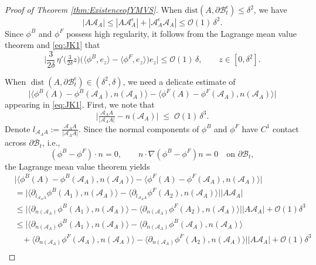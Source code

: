 \documentclass[11pt,twoside,reqno]{amsart}
\numberwithin{equation}{section}
\numberwithin{figure}{section}
\begin{document}
\begin{proof}[Proof of Theorem \ref{thm:ExistenceofYMVS}]
When $\mathrm{dist}(A,\partial\mathcal{B}_t^\epsilon)\leq \delta^2$, we have
\[
|A\mathcal{A}_A| 
  \leq |A\mathcal{A}_A^\epsilon| + |\mathcal{A}_A^\epsilon \mathcal{A}_A|
  \leq \mathcal{O}(1)\,\delta^2.
\]
Since $\phi^B$ and $\phi^F$ possess high regularity, it follows from the Lagrange mean value theorem and \eqref{eq:JK1} that
\begin{equation}\label{eq:JK3}
\bigg|
\frac{3}{2\delta}\,\eta'\!\Big(\tfrac{3}{2\delta}z\Big)
\Big(\langle \phi^B, e_z\rangle - \langle \phi^F, e_z\rangle\Big)e_z
\bigg|
\leq \mathcal{O}(1)\,\delta,
\qquad z \in [0,\delta^2].
\end{equation}

When $\operatorname{dist}(A,\partial\mathcal{B}_t^\epsilon)\in (\delta^2,\delta)$, we need a delicate estimate of
\[
\Big|\langle\phi^B(A)-\phi^B(\mathcal{A}_A),n(\mathcal{A}_A)\rangle
      -\langle\phi^F(A)-\phi^F(\mathcal{A}_A),n(\mathcal{A}_A)\rangle\Big|
\]
appearing in \eqref{eq:JK1}. First, we note that
\begin{equation}\label{eq:normal-approx}
\Big|\tfrac{\mathcal{A}_A A}{|\mathcal{A}_A A|}-n(\mathcal{A}_A)\Big|
\;\le\; \mathcal{O}(1)\,\delta^3 .
\end{equation}
Denote $l_{\mathcal{A}_A A}:=\tfrac{\mathcal{A}_A A}{|\mathcal{A}_A A|}$. Since the normal components of $\phi^B$ and $\phi^F$ have $C^1$ contact across $\partial\mathcal{B}_t$, i.e.,
\[
(\phi^B-\phi^F)\cdot n=0,\qquad
n\cdot\nabla(\phi^B-\phi^F)n=0\quad\text{on } \partial\mathcal{B}_t,
\]
the Lagrange mean value theorem  yields
\begin{equation}\label{eq:JK2}
    \begin{aligned}
       &\Big|\langle\phi^B(A)-\phi^B(\mathcal{A}_A),n(\mathcal{A}_A)\rangle-\langle\phi^F(A)-\phi^F(\mathcal{A}_A),n(\mathcal{A}_A)\rangle\Big|\\
       &=\Big|\langle\partial_{l_{\mathcal{A}_AA}}\phi^B(A_1),n(\mathcal{A}_A)\rangle-\langle\partial_{l_{\mathcal{A}_AA}}\phi^F(A_2),n(\mathcal{A}_A)\rangle\Big|\Big|A\mathcal{A}_A\Big|\\
       &\leq \Big|\langle\partial_{n(\mathcal{A}_A)}\phi^B(A_1),n(\mathcal{A}_A)\rangle-\langle\partial_{n(\mathcal{A}_A)}\phi^F(A_2),n(\mathcal{A}_A)\rangle\Big|\Big|A\mathcal{A}_A\Big|+\mathcal{O}(1)\delta^3\\
       &\leq \Big|\langle\partial_{n(\mathcal{A}_A)}\phi^B(A_1),n(\mathcal{A}_A)\rangle-\langle\partial_{n(\mathcal{A}_A)}\phi^B(\mathcal{A}_A),n(\mathcal{A}_A)\rangle\\&~~~~+\langle\partial_{n(\mathcal{A}_A)}\phi^F(\mathcal{A}_A),n(\mathcal{A}_A)\rangle-\langle\partial_{n(\mathcal{A}_A)}\phi^F(A_2),n(\mathcal{A}_A)\rangle\Big|\Big|A\mathcal{A}_A\Big|+\mathcal{O}(1)\delta^3\\

\end{aligned}
\end{equation}
\end{proof}
\end{document}
